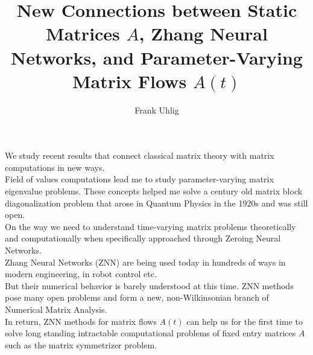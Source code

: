 \documentclass[a4paper]{amsart}
\date{}
\begin{document}
\title{New Connections  between Static Matrices $A$, Zhang Neural Networks, and Parameter-Varying Matrix Flows $A(t)$}
\author{Frank Uhlig} %
\address{Department of Mathematics and Statistics, \\ Auburn University, Auburn, AL 36849-5310, USA} %

\maketitle


We study recent results that connect classical matrix theory with matrix computations in new ways.\\[1mm]  
Field of values computations lead me to  study  parameter-varying matrix eigenvalue  problems. These concepts helped me solve a century old matrix block diagonalization problem that arose in Quantum Physics in the 1920s and was still open. \\[1mm]
 On the way we need to understand  time-varying matrix problems theoretically and computationally when specifically  approached through Zeroing Neural Networks.  \\[1mm] 
 Zhang Neural Networks (ZNN) are being used today in hundreds of ways in modern engineering, in robot control etc.\\[1mm]
 But their numerical behavior  is barely understood at this time. ZNN methods pose many open problems and form a  new, non-Wilkinsonian branch of Numerical Matrix  Analysis.\\
 In return,   ZNN methods for matrix flows $A(t)$ can help us for the
 first time to solve long standing intractable computational problems
 of fixed entry matrices $A$ such as the matrix symmetrizer problem.
 
\end{document}
